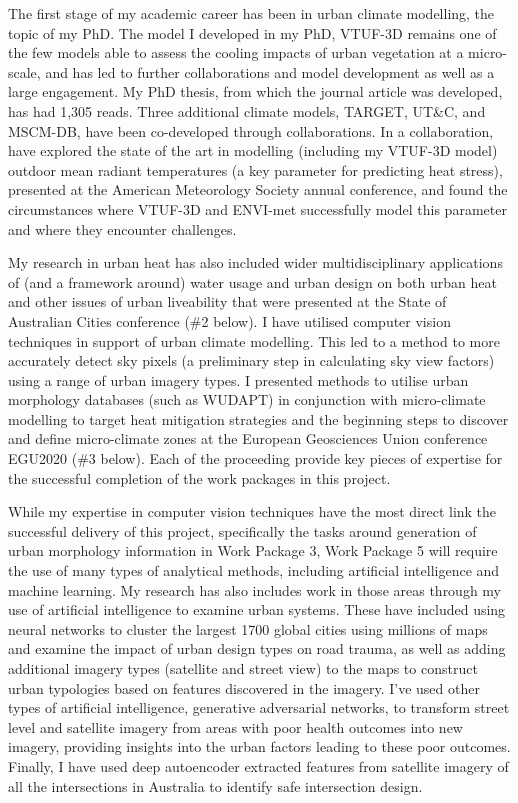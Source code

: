 The first stage of my academic career has been in urban climate modelling, the topic of my PhD. The model I developed in my PhD, VTUF-3D remains one of the few models able to assess the cooling impacts of urban vegetation at a micro-scale, and has led to further collaborations and model development as well as a large engagement. My PhD thesis, from which the journal article was developed, has had 1,305 reads. Three additional climate models, TARGET, UT\&C, and MSCM-DB, have been co-developed through collaborations. In a collaboration, have explored the state of the art in modelling (including my VTUF-3D model) outdoor mean radiant temperatures (a key parameter for predicting heat stress), presented at the American Meteorology Society annual conference, and found the circumstances where VTUF-3D and ENVI-met successfully model this parameter and where they encounter challenges. 

My research in urban heat has also included wider multidisciplinary applications of (and a framework around) water usage and urban design on both urban heat and other issues of urban liveability that were presented at the State of Australian Cities conference (\#2 below). I have utilised computer vision techniques in support of urban climate modelling. This led to a method to more accurately detect sky pixels (a preliminary step in calculating sky view factors) using a range of urban imagery types. I presented methods to utilise urban morphology databases (such as WUDAPT) in conjunction with micro-climate modelling to target heat mitigation strategies and the beginning steps to discover and define micro-climate zones at the European Geosciences Union conference EGU2020 (\#3 below). Each of the proceeding provide key pieces of expertise for the successful completion of the work packages in this project.

While my expertise in computer vision techniques have the most direct link the successful delivery of this project, specifically the tasks around generation of urban morphology information in Work Package 3, Work Package 5 will require the use of many types of analytical methods, including artificial intelligence and machine learning. My research has also includes work in those areas through my use of artificial intelligence to examine urban systems. These have included using neural networks to cluster the largest 1700 global cities using millions of maps and examine the impact of urban design types on road trauma, as well as adding additional imagery types (satellite and street view) to the maps to construct urban typologies based on features discovered in the imagery. I've used other types of artificial intelligence, generative adversarial networks, to transform street level and satellite imagery from areas with poor health outcomes into new imagery, providing insights into the urban factors leading to these poor outcomes. Finally, I have used deep autoencoder extracted features from satellite imagery of all the intersections in Australia to identify safe intersection design. 




